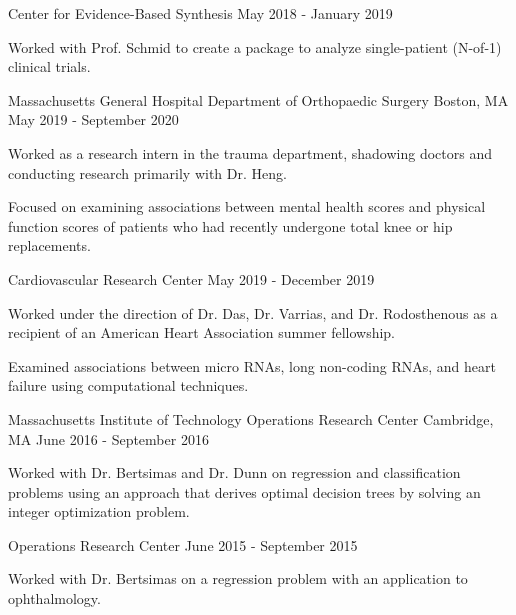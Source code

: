 \begin{cventries}
  \cventry
  {} %
  {Center for Evidence-Based Synthesis} %
  {} %
  {May 2018 - January 2019} %
  {
    \begin{cvitems} %
    \item {Worked with Prof. Schmid to create a package to analyze
      single-patient (N-of-1) clinical trials.}
    \end{cvitems}
  }

  \cventry
  {Massachusetts General Hospital} %
  {Department of Orthopaedic Surgery} %
  {Boston, MA} %
  {May 2019 - September 2020} %
  {
    \begin{cvitems} %
    \item {Worked as a research intern in the trauma department, shadowing
      doctors and conducting research primarily with Dr. Heng.}
    \item {Focused on examining associations between mental health scores
        and physical function scores of patients who had recently undergone
      total knee or hip replacements.}
    \end{cvitems}
  }

  \cventry
  {} %
  {Cardiovascular Research Center} %
  {} %
  {May 2019 - December 2019} %
  {
    \begin{cvitems} %
    \item {Worked under the direction of Dr. Das, Dr. Varrias, and Dr.
        Rodosthenous as a recipient of an American Heart Association summer
      fellowship.}
    \item {Examined associations between micro RNAs, long non-coding RNAs, and
      heart failure using computational techniques.}
    \end{cvitems}
  }

  \cventry
  {Massachusetts Institute of Technology} %
  {Operations Research Center} %
  {Cambridge, MA} %
  {June 2016 - September 2016} %
  {
    \begin{cvitems} %
    \item {Worked with Dr. Bertsimas and Dr. Dunn on regression and
        classification problems using an approach that derives optimal decision
      trees by solving an integer optimization problem.}
    \end{cvitems}
  }

  \cventry
  {} %
  {Operations Research Center} %
  {} %
  {June 2015 - September 2015} %
  {
    \begin{cvitems} %
    \item {Worked with Dr. Bertsimas on a regression problem with an
      application to ophthalmology.}
    \end{cvitems}
  }

\end{cventries}
